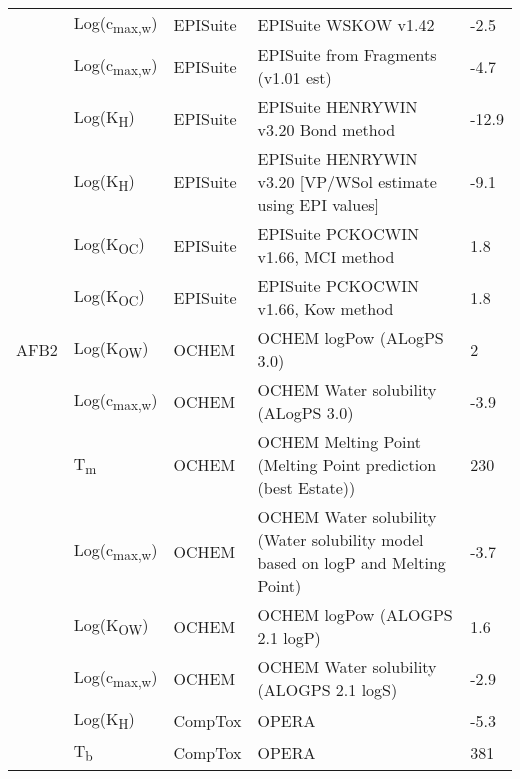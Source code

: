 \begin{landscape}
\begin{longtable}[c]{lllll}
          & Log(c\textsubscript{max,w}) & EPISuite   & EPISuite WSKOW v1.42                                                            & -2.5  \\
          & Log(c\textsubscript{max,w}) & EPISuite   & EPISuite from Fragments (v1.01 est)                                             & -4.7  \\
          & Log(K\textsubscript{H})       & EPISuite   & EPISuite HENRYWIN v3.20 Bond method                                             & -12.9 \\
          & Log(K\textsubscript{H})       & EPISuite   & EPISuite HENRYWIN v3.20 [VP/WSol estimate using EPI values]                     & -9.1  \\
          & Log(K\textsubscript{OC})      & EPISuite   & EPISuite PCKOCWIN v1.66, MCI method                                             & 1.8   \\
          & Log(K\textsubscript{OC})      & EPISuite   & EPISuite PCKOCWIN v1.66, Kow method                                             & 1.8   \\
          \hline
AFB2      & Log(K\textsubscript{OW})      & OCHEM      & OCHEM logPow (ALogPS 3.0)                                                       & 2     \\
          & Log(c\textsubscript{max,w}) & OCHEM      & OCHEM Water solubility (ALogPS 3.0)                                             & -3.9  \\
          & T\textsubscript{m}          & OCHEM      & OCHEM Melting Point (Melting Point prediction (best Estate))                    & 230   \\
          & Log(c\textsubscript{max,w}) & OCHEM      & OCHEM Water solubility (Water solubility model based on logP and Melting Point) & -3.7  \\
          & Log(K\textsubscript{OW})      & OCHEM      & OCHEM logPow (ALOGPS 2.1 logP)                                                  & 1.6   \\
          & Log(c\textsubscript{max,w}) & OCHEM      & OCHEM Water solubility (ALOGPS 2.1 logS)                                        & -2.9  \\
          & Log(K\textsubscript{H})       & CompTox    & OPERA                                                                           & -5.3  \\
          & T\textsubscript{b}          & CompTox    & OPERA                                                                           & 381   \\

\end{longtable}
\end{landscape}
